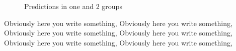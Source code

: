 \documentclass{article}
\begin{document}
\begin{figure}[H]
    \centering
    \quad
    \quad
    \caption{Predictions in one and 2 groups}
\end{figure}

Obviously here you write something, Obviously here you write something, Obviously here you write something, Obviously here you write something, Obviously here you write something, Obviously here you write something, 
\end{document}
